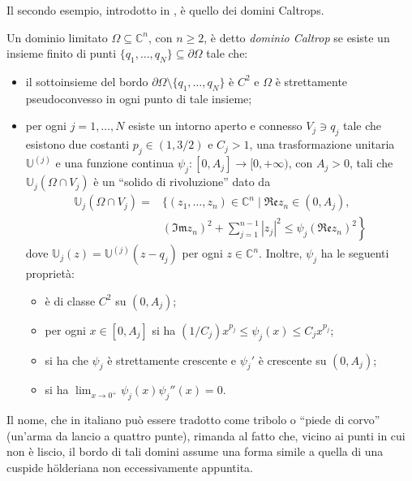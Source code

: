 Il secondo esempio, introdotto in \cite{BM}, è quello dei domini Caltrops.

\begin{defn}
    Un dominio limitato $\Omega\subseteq\mathbb{C}^n$, con $n\ge 2$, è detto \textit{dominio Caltrop} se esiste un insieme finito di punti $\{q_1,\dots,q_N\}\subseteq\partial\Omega$ tale che:
    \begin{itemize}
        \item il sottoinsieme del bordo $\partial\Omega\setminus\{q_1,\dots,q_N\}$ è $C^2$ e $\Omega$ è strettamente pseudoconvesso in ogni punto di tale insieme;
        \item per ogni $j=1,\dots, N$ esiste un intorno aperto e connesso $V_j\ni q_j$ tale che esistono due costanti $p_j\in(1,3/2)$ e $C_j>1$, una trasformazione unitaria $\mathbb{U}^{(j)}$ e una funzione continua $\psi_j:[0,A_j]\longrightarrow[0,+\infty)$, con $A_j>0$, tali che $\mathbb{U}_j(\Omega\cap V_j)$ è un ``solido di rivoluzione'' dato da
        \begin{align*}
            \mathbb{U}_j(\Omega\cap V_j)=&\Bigg\{(z_1,\dots,z_n)\in\mathbb{C}^n\mid \mathfrak{Re}z_n\in (0,A_j),\\
            &\left.(\mathfrak{Im}z_n)^2+\sum_{j=1}^{n-1}|z_j|^2 \le \psi_j(\mathfrak{Re}z_n)^2\right\}
        \end{align*}
        dove $\mathbb{U}_j(z)=\mathbb{U}^{(j)}(z-q_j)$ per ogni $z\in\mathbb{C}^n$. Inoltre, $\psi_j$ ha le seguenti proprietà:
        \begin{itemize}
            \item è di classe $C^2$ su $(0,A_j)$;
            \item per ogni $x\in[0,A_j]$ si ha $(1/C_j)x^{p_j} \le \psi_j(x) \le C_jx^{p_j}$;
            \item si ha che $\psi_j$ è strettamente crescente e $\psi_j'$ è crescente su $(0,A_j)$;
            \item si ha $\displaystyle\lim_{x\longrightarrow0^+}\psi_j(x)\psi_j''(x)=0$.
        \end{itemize}
    \end{itemize}
\end{defn}

\begin{oss}
    Il nome, che in italiano può essere tradotto come tribolo o ``piede di corvo'' (un'arma da lancio a quattro punte), rimanda al fatto che, vicino ai punti in cui non è liscio, il bordo di tali domini assume una forma simile a quella di una cuspide hölderiana non eccessivamente appuntita.
\end{oss}

